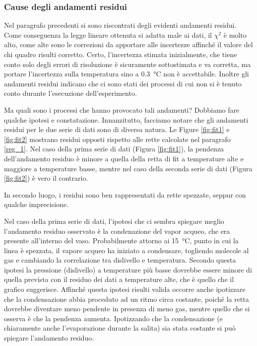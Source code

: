 \subsubsection{Cause degli andamenti residui}

Nel paragrafo precedenti si sono riscontrati degli evidenti andamenti residui. Come conseguenza la legge lineare ottenuta
si adatta male ai dati, il $\chi^2$ è molto alto, come alte sono le correzioni da apportare alle incertezze affinché 
il valore del chi quadro risulti corretto. Certo, l'incertezza stimata inizialmente, che tiene conto solo degli errori di risoluzione
è sicuramente sottostimata e va corretta, ma portare l'incertezza sulla temperatura sino a \SI{0.3}{\celsius} non è accettabile.
Inoltre gli andamenti residui indicano che ci sono stati dei processi di cui non si è tenuto conto durante l'esecuzione dell'esperimento.

Ma quali sono i processi che hanno provocato tali andamenti? Dobbiamo fare qualche ipotesi e constatazione. Innanzitutto,
facciamo notare che gli andamenti residui per le due serie di dati sono di diversa natura. Le Figure \ref{fig:fit1} e
\ref{fig:fit2} mostrano residui opposti rispetto alle rette calcolate nel paragrafo \ref{reg_1}. Nel caso della prima
serie di dati (Figura \ref{fig:fit1}), la pendenza dell'andamento residuo è minore a quella della retta di fit a
temperature alte e maggiore a temperature basse, mentre nel caso della seconda serie di dati (Figura \ref{fig:fit2}) è
vero il contrario.

In secondo luogo, i residui sono ben rappresentati da rette spezzate, seppur con qualche imprecisione.

Nel caso della prima serie di dati, l'ipotesi che ci sembra spiegare meglio l'andamento residuo osservato è la condenazione
del vapor acqueo, che era presente all'interno del vaso. Probabilmente attorno ai \SI{15}{\celsius}, punto in cui la linea
è spezzata, il vapore acqueo ha iniziato a condensare, togliendo molecole al gas e cambiando la correlazione tra dislivello e
temperatura. Secondo questa ipotesi la pressione (dislivello) a temperature più basse dovrebbe essere minore di quella prevista
con il residuo dei dati a temperature alte, che è quello che il grafico suggerisce.
Affinché questa ipotesi risulti valida occorre anche ipotizzare che la condensazione abbia proceduto ad un ritmo circa costante,
poiché la retta dovrebbe diventare meno pendente in presenza di meno gas, mentre quello che si osserva è che la pendenza aumenta.
Ipotizzando che la condensazione (e chiaramente anche l'evaporazione durante la salita) sia stata costante si può spiegare 
l'andamento residuo. 

